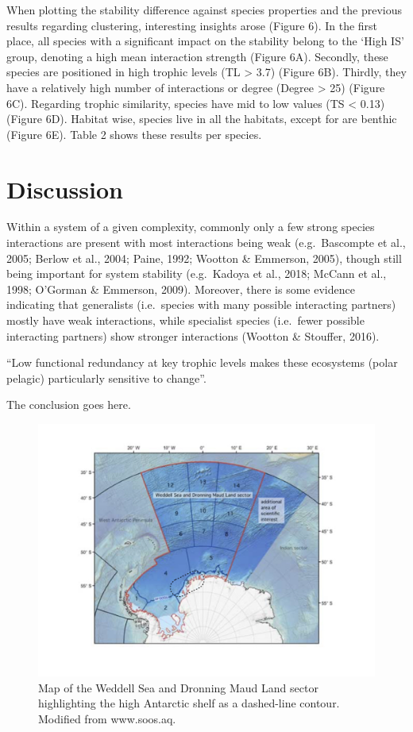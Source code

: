 \documentclass[gc, manuscript]{copernicus}
\begin{document}
When plotting the stability difference against species properties and
the previous results regarding clustering, interesting insights arose
(Figure 6). In the first place, all species with a significant impact on
the stability belong to the `High IS' group, denoting a high mean
interaction strength (Figure 6A). Secondly, these species are positioned
in high trophic levels (TL \textgreater{} 3.7) (Figure 6B). Thirdly,
they have a relatively high number of interactions or degree (Degree
\textgreater{} 25) (Figure 6C). Regarding trophic similarity, species
have mid to low values (TS \textless{} 0.13) (Figure 6D). Habitat wise,
species live in all the habitats, except for are benthic (Figure 6E).
Table 2 shows these results per species.

\section{Discussion}

Within a system of a given complexity, commonly only a few strong
species interactions are present with most interactions being weak
(e.g.~Bascompte et al., 2005; Berlow et al., 2004; Paine, 1992; Wootton
\& Emmerson, 2005), though still being important for system stability
(e.g.~Kadoya et al., 2018; McCann et al., 1998; O'Gorman \& Emmerson,
2009). Moreover, there is some evidence indicating that generalists
(i.e.~species with many possible interacting partners) mostly have weak
interactions, while specialist species (i.e.~fewer possible interacting
partners) show stronger interactions (Wootton \& Stouffer, 2016).

``Low functional redundancy at key trophic levels makes these ecosystems
(polar pelagic) particularly sensitive to change''. \citep{Murphy2016}

\clearpage
\conclusions[Conclusions]

The conclusion goes here.

\clearpage

\begin{figure}
\includegraphics[width=12cm]{Fig.1_StudyMap} \caption{Map of the Weddell Sea and Dronning Maud Land sector highlighting the high Antarctic shelf as a dashed-line contour. Modified from www.soos.aq.}\label{fig:unnamed-chunk-1}
\end{figure}
\end{document}
